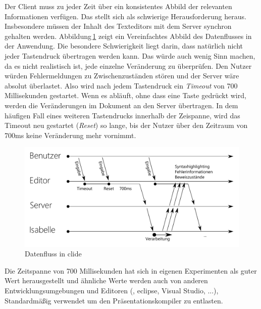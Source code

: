 Der Client muss zu jeder Zeit über ein konsistentes Abbild der relevanten Informationen verfügen.
Das stellt sich als schwierige Herausforderung heraus. Insbesondere müssen der Inhalt des
Texteditors mit dem Server synchron gehalten werden. Abbildung\,\ref{fig:diagram-workflow} zeigt ein
Vereinfachtes Abbild des Datenflusses in der Anwendung. Die besondere Schwierigkeit liegt darin,
dass natürlich nicht jeder Tastendruck übertragen werden kann. Das würde auch wenig Sinn machen, da
es nicht realistisch ist, jede einzelne Veränderung zu überprüfen. Den Nutzer würden Fehlermeldungen
zu Zwischenzuständen stören und der Server wäre absolut überlastet. Also wird nach jedem Tastendruck
ein \textit{Timeout} von 700 Millisekunden gestartet. Wenn es abläuft, ohne dass eine Taste gedrückt
wird, werden die Veränderungen im Dokument an den Server übertragen. In dem häufigen Fall eines
weiteren Tastendrucks innerhalb der Zeispanne, wird das Timeout neu gestartet (\textit{Reset}) so
lange, bis der Nutzer über den Zeitraum von 700ms keine Veränderung mehr vornimmt.

\begin{figure}[ht]
\includegraphics[width=\linewidth]{images/diagram-workflow}
  \caption{Datenfluss in clide}  
  \label{fig:diagram-workflow}
\end{figure}

Die Zeitspanne von 700 Millisekunden hat sich in eigenen Experimenten als guter Wert herausgestellt
und ähnliche Werte werden auch von anderen Entwicklungsumgebungen und Editoren (, eclipse,
Visual Studio, ...), Standardmäßig verwendet um den Präsentationskompiler zu entlasten.

